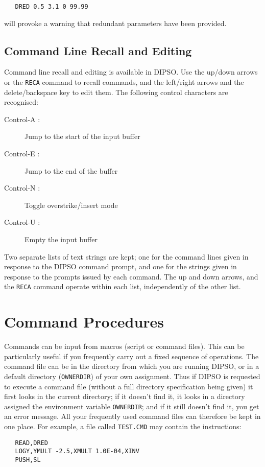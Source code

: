 \documentclass[twoside,11pt]{article}
\newcommand{\htmlref}[2]{#1}
\renewcommand{\_}{\texttt{\symbol{95}}}
\newenvironment{dipdesc}{\begin{description}}{\end{description}}
\newcommand{\dipitem}[2]{ \item[{#1}] {#2} }
\newenvironment{dipdesc}{\begin{itemize}}{\end{itemize}}
\newcommand{\dipitem}[2]{ \item {\bf{#1}} {#2} }
\begin{document}
\begin{verbatim}
   DRED 0.5 3.1 0 99.99
\end{verbatim}

will provoke a warning that redundant parameters have been provided.

\subsection{Command Line Recall and Editing}
Command line recall and editing is available in DIPSO. Use the up/down
arrows or the \htmlref{{\tt{RECA}}}{COM:RECA}  command to recall commands, and the left/right
arrows and the delete/backspace key to edit them. The following control
characters are recognised:

\begin{dipdesc}
\dipitem {Control-A :}{ Jump to the start of the input buffer }
\dipitem {Control-E :}{ Jump to the end of the buffer }
\dipitem {Control-N :}{ Toggle overstrike/insert mode }
\dipitem {Control-U :}{ Empty the input buffer}
\end{dipdesc}

Two separate lists of text strings are kept; one for the command lines
given in response to the DIPSO command prompt, and one for the strings
given in response to the prompts issued by each command. The up and down
arrows, and the \htmlref{{\tt{RECA}}}{COM:RECA}  command operate within each list, independently
of the other list.

\section {Command Procedures}

Commands can be input from macros (script or command files). This can
be particularly useful if you frequently carry out a fixed sequence of
operations. The command file can be in the directory from which you
are running DIPSO, or in a default directory ({\tt{OWNERDIR}})  of your own
assignment. Thus if DIPSO is requested to execute a command file
(without a full directory specification being given) it first looks in
the current directory; if it doesn't find it, it looks in a directory
assigned the environment variable {\tt{OWNERDIR}};  and if it
still doesn't find it, you get an error message. All your frequently
used command files can therefore be kept in one place. For example, a
file called {\tt{TEST.CMD}}  may contain the instructions:

\begin{verbatim}
   READ,DRED
   LOGY,YMULT -2.5,XMULT 1.0E-04,XINV
   PUSH,SL
\end{verbatim}
\end{document}
